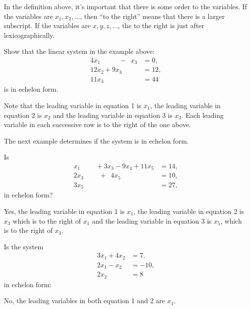 In the definition above, it's important that there is some order to the variables.  If the variables are $x_1, x_2, \ldots$, then ``to the right'' means that there is a larger subscript.   If the variables are $x,y,z,\ldots$, the to the right is just after lexicographically.  


\begin{example} 

Show that  the linear system in the example above:
%
\begin{align*}
4x_1\phantom{+11x_3} -\phantom{9} x_3 & = 0, \\
 12x_2 +9x_3 & = 12, \\
11x_3 & =  44
\end{align*}
is in echelon form.  

\solution

Note that the leading variable in equation 1 is $x_1$, the leading variable in equation 2 is $x_2$ and the leading variable in equation 3 is $x_3$.  Each leading variable in each successive row is to the right of the one above. 

\end{example}

The next example determines if the system is in echelon form. 

\pagebreak

\begin{example}  \label{eq:echelon:form:3by5}
Is 
%
\begin{align*}
x_1\phantom{+2x_3} + 3x_3 -9 x_4 + 11 x_5 & = 14, \\
2x_3 \phantom{-9x_4} +\phantom{1} 4x_5 & = 10, \\
3x_5 & = 27,
\end{align*}
in echelon form? 

\solution

Yes, the leading variable in equation 1 is $x_1$, the leading variable in equation 2 is $x_3$ which is to the right of $x_1$ and the leading variable in equation 3 is $x_5$, which is to the right of $x_3$.    
\end{example}

\begin{example}
Is the system 
%
\begin{align*}  %
3x_1 + 4 x_2 & = 7, \\
2x_1 -x_2 & = -10, \\
2x_2 & = 8 
\end{align*}
in echelon form: 

\solution

No,  the leading variables in both equation 1 and 2 are $x_1$.  

\end{example}


